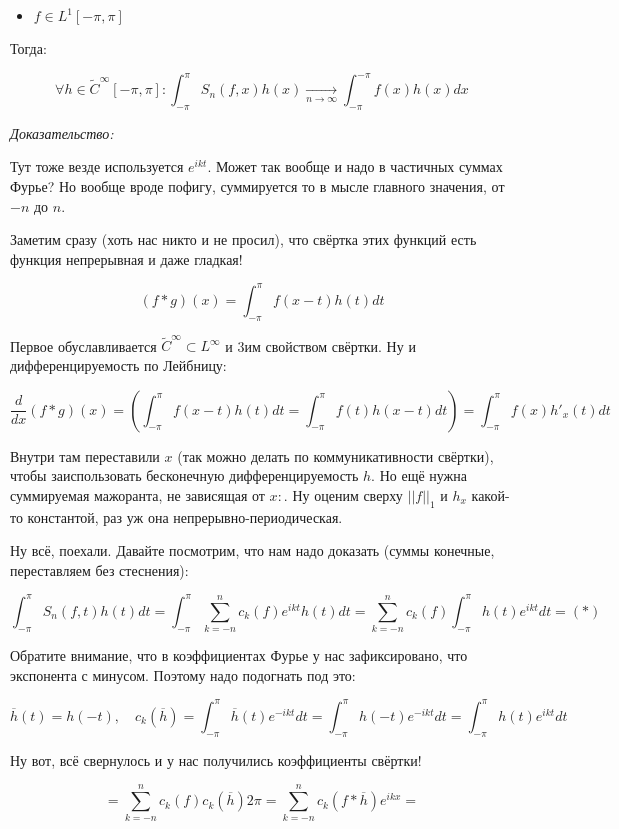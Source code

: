 \documentclass{article}
\def\goesto#1{\underset{#1}{\longrightarrow}}
\def\toinf#1{\goesto{#1 \rightarrow \infty}}
\def\ntoinf{\toinf{n}}
\begin{document}
\begin{itemize}
    \item $f \in L^1[-\pi, \pi]$
\end{itemize}

Тогда:

\[\forall h \in \tilde{C}^{\infty}[-\pi, \pi]: \int_{-\pi}^{\pi} S_n(f, x)h(x) \ntoinf \int_{-\pi}^{-\pi} f(x)h(x)dx\]

\textit{Доказательство:}

Тут тоже везде используется $e^{ikt}$. Может так вообще и надо в частичных суммах Фурье? Но вообще вроде пофигу, суммируется то в мысле главного значения, от $-n$ до $n$.


Заметим сразу (хоть нас никто и не просил), что свёртка этих функций есть функция непрерывная и даже гладкая!

\[(f * g)(x) = \int_{-\pi}^{\pi} f(x - t)h(t) dt\]

Первое обуславливается $\tilde{C}^{\infty} \subset L^{\infty}$ и 3им свойством свёртки. Ну и дифференцируемость по Лейбницу:

\[\frac{d}{dx}(f * g)(x) = \left( \int_{-\pi}^{\pi} f(x - t)h(t) dt =  \int_{-\pi}^{\pi} f(t)h(x - t) dt\right) =  \int_{-\pi}^{\pi} f(x)h'_x(t) dt\]

Внутри там переставили $x$ (так можно делать по коммуникативности свёртки), чтобы заиспользовать бесконечную дифференцируемость $h$. Но ещё нужна суммируемая мажоранта, не зависящая от $x:$. Ну оценим сверху $||f||_1$ и $h_x$ какой-то константой, раз уж она непрерывно-периодическая.

Ну всё, поехали. Давайте посмотрим, что нам надо доказать (суммы конечные, переставляем без стеснения):

\[\int_{-\pi}^{\pi} S_n(f, t) h(t) dt = \int_{-\pi}^{\pi} \sum_{k = -n}^{n} c_k(f)  e^{ikt} h(t) dt = \sum_{k = -n}^{n}c_k(f)\int_{-\pi}^{\pi}h(t) e^{ikt}dt = (*)\]

Обратите внимание, что в коэффициентах Фурье у нас зафиксировано, что экспонента с минусом.  Поэтому надо подогнать под это:

\[\overline{h}(t) = h(-t), \quad c_k(\overline{h}) = \int_{-\pi}^{\pi} \overline{h}(t) e^{-ikt} dt = \int_{-\pi}^{\pi} h(-t)e^{-ikt} dt = \int_{-\pi}^{\pi} h(t) e^{ikt} dt\]

Ну вот, всё свернулось и у нас получились коэффициенты свёртки!

\[= \sum_{k = -n}^{n} c_k(f)c_k(\overline{h})2 \pi = \sum_{k  =-n}^{n} c_k(f * \overline{h}) e^{ikx} = \]
\end{document}
